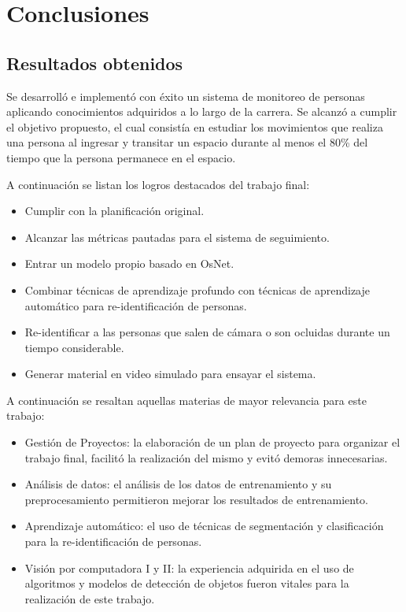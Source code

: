
\chapter{Conclusiones} %

\label{Chapter5} %




\section{Resultados obtenidos}

Se desarrolló e implementó con éxito un sistema de monitoreo de personas aplicando conocimientos adquiridos a lo largo de la carrera. Se alcanzó a cumplir el objetivo propuesto, el cual consistía en estudiar los movimientos que realiza una persona al ingresar y transitar un espacio durante al menos el 80\% del tiempo que la persona permanece en el espacio.

A continuación se listan los logros destacados del trabajo final:
\begin{itemize}
\item Cumplir con la planificación original.
\item Alcanzar las métricas pautadas para el sistema de seguimiento.
\item Entrar un modelo propio basado en OsNet.
\item Combinar técnicas de aprendizaje profundo con técnicas de aprendizaje automático para re-identificación de personas.
\item Re-identificar a las personas que salen de cámara o son ocluidas durante un tiempo considerable.
\item Generar material en video simulado para ensayar el sistema.
\end{itemize}


A continuación se resaltan aquellas materias de mayor relevancia para este trabajo:
\begin{itemize}
\item Gestión de Proyectos: la elaboración de un plan de proyecto para organizar el trabajo final, facilitó la realización del mismo y evitó demoras innecesarias.
\item Análisis de datos: el análisis de los datos de entrenamiento y su preprocesamiento permitieron mejorar los resultados de entrenamiento.
\item Aprendizaje automático: el uso de técnicas de segmentación y clasificación para la re-identificación de personas.
\item Visión por computadora I y II: la experiencia adquirida en el uso de algoritmos y modelos de detección de objetos fueron vitales para la realización de este trabajo.
\end{itemize}

